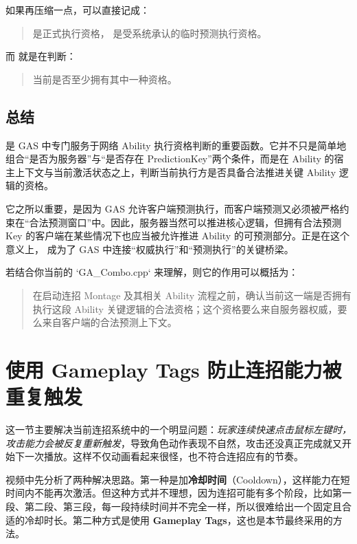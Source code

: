 如果再压缩一点，可以直接记成：

\begin{quote}
	 是正式执行资格， 是受系统承认的临时预测执行资格。
\end{quote}

而  就是在判断：

\begin{quote}
	当前是否至少拥有其中一种资格。
\end{quote}

\subsection{总结}

 是 GAS 中专门服务于网络 Ability 执行资格判断的重要函数。它并不只是简单地组合“是否为服务器”与“是否存在 PredictionKey”两个条件，而是在 Ability 的宿主上下文与当前激活状态之上，判断当前执行方是否具备合法推进关键 Ability 逻辑的资格。

它之所以重要，是因为 GAS 允许客户端预测执行，而客户端预测又必须被严格约束在“合法预测窗口”中。因此，服务器当然可以推进核心逻辑，但拥有合法预测 Key 的客户端在某些情况下也应当被允许推进 Ability 的可预测部分。正是在这个意义上， 成为了 GAS 中连接“权威执行”和“预测执行”的关键桥梁。

若结合你当前的 `GA\_Combo.cpp` 来理解，则它的作用可以概括为：

\begin{quote}
	在启动连招 Montage 及其相关 Ability 流程之前，确认当前这一端是否拥有执行这段 Ability 关键逻辑的合法资格；这个资格要么来自服务器权威，要么来自客户端的合法预测上下文。
\end{quote}

\section{使用 Gameplay Tags 防止连招能力被重复触发}

这一节主要解决当前连招系统中的一个明显问题：\emph{玩家连续快速点击鼠标左键时，攻击能力会被反复重新触发}，导致角色动作表现不自然，攻击还没真正完成就又开始下一次播放。这样不仅动画看起来很怪，也不符合连招应有的节奏。

视频中先分析了两种解决思路。第一种是加\textbf{冷却时间}（Cooldown），这样能力在短时间内不能再次激活。但这种方式并不理想，因为连招可能有多个阶段，比如第一段、第二段、第三段，每一段持续时间并不完全一样，所以很难给出一个固定且合适的冷却时长。第二种方式是使用 \textbf{Gameplay Tags}，这也是本节最终采用的方法。

